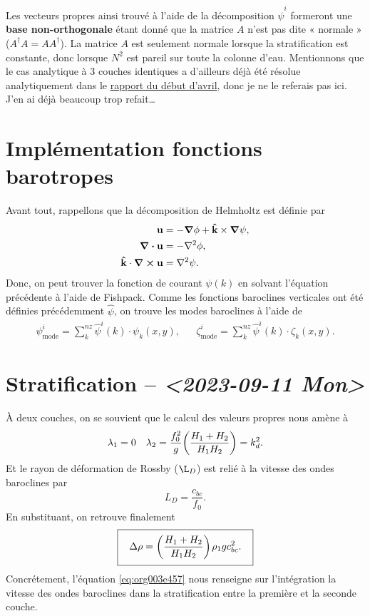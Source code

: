\documentclass[10pt]{article}
\numberwithin{equation}{section}
\newcommand{\kvf}{\vb{\hat{k}}}
\newcommand{\uu}{\vb{u}}
\newcommand{\venti}{\vphantom{\sum_x^x}}
\newcommand{\pt}{\hspace{1pt}} %
\begin{document}
Les vecteurs propres ainsi trouvé à l'aide de la décomposition \(\hat{\psi}^i\) formeront une \textbf{base non-orthogonale} étant donné que la matrice \(A\) n'est pas dite « normale » (\(A^\dagger A = A A^\dagger\)).
La matrice \(A\) est seulement normale lorsque la stratification est constante, donc lorsque
\(N^2\) est pareil sur toute la colonne d'eau.
Mentionnons que le cas analytique à 3 couches identiques a d'ailleurs déjà été résolue analytiquement dans le \href{rapport-2023-04-07.pdf}{rapport du début d'avril}, donc je ne le referais pas ici.
J'en ai déjà beaucoup trop refait\ldots{}

\section{Implémentation fonctions barotropes}
\label{sec:orga905775}
Avant tout, rappellons que la décomposition de Helmholtz est définie par
\begin{subequations}
\begin{align}
   \uu &= -\gradient{\phi} + \kvf \times \gradient{\psi},\\
   \divergence{\uu} &= -\laplacian{\phi},\\
   \kvf\cdot\curl{\uu} &= \laplacian{\psi}.
\end{align}
\end{subequations}
Donc, on peut trouver la fonction de courant \(\psi(k)\) en solvant l'équation précédente à l'aide de Fishpack.
Comme les fonctions baroclines verticales ont été définies précédemment \(\hat{\psi}\), on trouve les modes baroclines à l'aide de
\begin{align}
   &&\psi_\text{mode}^i = \sum_k^{nz} \hat{\psi}^i(k)\cdot  \psi_k(x,y),
   &&\zeta_\text{mode}^i = \sum_k^{nz} \hat{\psi}^i(k)\cdot  \zeta_k(x,y).&&
\end{align}



\section{Stratification -- \textit{<2023-09-11 Mon>}}
\label{sec:org403e590}
À deux couches, on se souvient que le calcul des valeurs propres nous amène à
\begin{align}
   && \lambda_1 = 0 && \lambda_2 = \frac{f_0^2}{g} \qty(\frac{H_1+H_2}{H_1 H_2}) = k_d^2. &&
\end{align}
Et le rayon de déformation de Rossby (\(\L_D\)) est relié à la vitesse des ondes baroclines par
\begin{equation}
   L_D = \frac{c_{bc}}{f_0}.
\end{equation}
En substituant, on retrouve finalement
\begin{equation}
\label{eq:org003e457}
   \boxed{\hspace{0.3cm}\Delta\rho = \qty(\frac{H_1+H_2}{H_1H_2})\pt\rho_1 g c_{bc}^2.\venti\hspace{0.3cm}}
\end{equation}
Concrétement, l'équation \ref{eq:org003e457} nous renseigne sur l'intégration la vitesse des ondes baroclines dans la stratification entre la première et la seconde couche.
\end{document}
